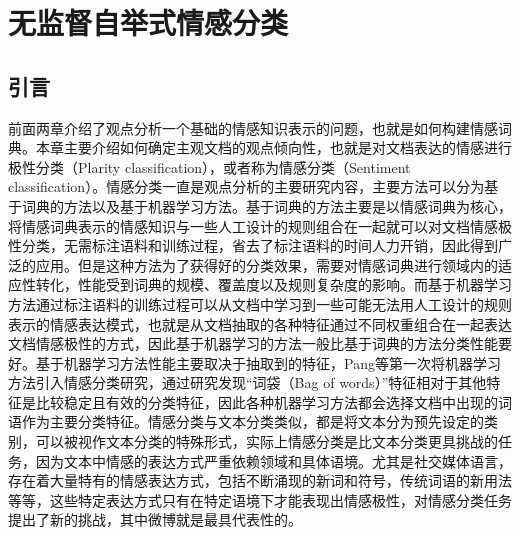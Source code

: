 \chapter{无监督自举式情感分类}
\label{ch4}

\section{引言}
\label{ch4_intr}
前面两章介绍了观点分析一个基础的情感知识表示的问题，也就是如何构建情感词典。本章主要介绍如何确定主观文档的观点倾向性，也就是对文档表达的情感进行极性分类（Plarity classification），或者称为情感分类（Sentiment classification）。情感分类一直是观点分析的主要研究内容，主要方法可以分为基于词典的方法以及基于机器学习方法。基于词典的方法主要是以情感词典为核心，将情感词典表示的情感知识与一些人工设计的规则组合在一起就可以对文档情感极性分类，无需标注语料和训练过程，省去了标注语料的时间人力开销，因此得到广泛的应用。但是这种方法为了获得好的分类效果，需要对情感词典进行领域内的适应性转化，性能受到词典的规模、覆盖度以及规则复杂度的影响。而基于机器学习方法通过标注语料的训练过程可以从文档中学习到一些可能无法用人工设计的规则表示的情感表达模式，也就是从文档抽取的各种特征通过不同权重组合在一起表达文档情感极性的方式，因此基于机器学习的方法一般比基于词典的方法分类性能要好。基于机器学习方法性能主要取决于抽取到的特征，Pang等第一次将机器学习方法引入情感分类研究，通过研究发现“词袋（Bag of words）”特征相对于其他特征是比较稳定且有效的分类特征，因此各种机器学习方法都会选择文档中出现的词语作为主要分类特征。情感分类与文本分类类似，都是将文本分为预先设定的类别，可以被视作文本分类的特殊形式，实际上情感分类是比文本分类更具挑战的任务，因为文本中情感的表达方式严重依赖领域和具体语境。尤其是社交媒体语言，存在着大量特有的情感表达方式，包括不断涌现的新词和符号，传统词语的新用法等等，这些特定表达方式只有在特定语境下才能表现出情感极性，对情感分类任务提出了新的挑战，其中微博就是最具代表性的。

%

